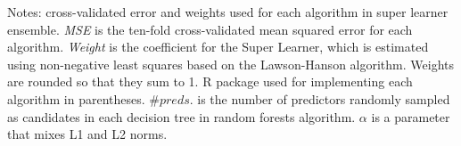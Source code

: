 \documentclass[hidelinks,12pt]{article}
\begin{document}
{\begin{appendices}
\begin{table}[h]
\begin{tabularx}{\linewidth}{l*{3}{Y}}
   \hline
    \bottomrule
  \end{tabularx}
\footnotesize{{\color{red}Notes: cross-validated error and weights used for each algorithm in super learner ensemble. \textit{MSE} is the ten-fold cross-validated mean squared error for each algorithm. \textit{Weight} is the coefficient for the Super Learner, which is estimated using non-negative least squares based on the Lawson-Hanson algorithm. Weights are rounded so that they sum to 1. \textsf{R} package used for implementing each algorithm in parentheses. $\# preds.$ is the number of predictors randomly sampled as candidates in each decision tree in random forests algorithm. $\alpha$ is a parameter that mixes L1 and L2 norms.}}
\end{table}

\pagebreak


\end{appendices}}
\end{document}
